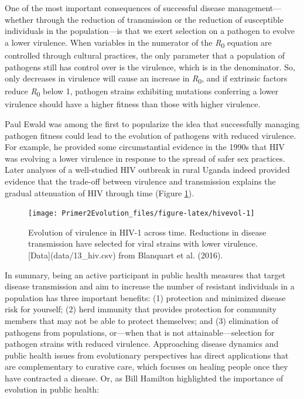 \documentclass[
]{book}
\begin{document}
One of the most important consequences of successful disease management---whether through the reduction of transmission or the reduction of susceptible individuals in the population---is that we exert selection on a pathogen to evolve a lower virulence. When variables in the numerator of the \emph{R}\textsubscript{0} equation are controlled through cultural practices, the only parameter that a population of pathogens still has control over is the virulence, which is in the denominator. So, only decreases in virulence will cause an increase in \emph{R}\textsubscript{0}, and if extrinsic factors reduce \emph{R}\textsubscript{0} below 1, pathogen strains exhibiting mutations conferring a lower virulence should have a higher fitness than those with higher virulence.

Paul Ewald was among the first to popularize the idea that successfully managing pathogen fitness could lead to the evolution of pathogens with reduced virulence. For example, he provided some circumstantial evidence in the 1990s that HIV was evolving a lower virulence in response to the spread of safer sex practices. Later analyses of a well-studied HIV outbreak in rural Uganda indeed provided evidence that the trade-off between virulence and transmission explains the gradual attenuation of HIV through time (Figure \ref{fig:hivevol}).

\begin{figure}
\texttt{[image: Primer2Evolution\_files/figure-latex/hivevol-1]} \caption{Evolution of virulence in HIV-1 across time. Reductions in disease transmission have selected for viral strains with lower virulence. [Data](data/13_hiv.csv) from Blanquart et al. (2016).}\label{fig:hivevol}
\end{figure}

In summary, being an active participant in public health measures that target disease transmission and aim to increase the number of resistant individuals in a population has three important benefits: (1) protection and minimized disease risk for yourself; (2) herd immunity that provides protection for community members that may not be able to protect themselves; and (3) elimination of pathogens from populations, or---when that is not attainable---selection for pathogen strains with reduced virulence. Approaching disease dynamics and public health issues from evolutionary perspectives has direct applications that are complementary to curative care, which focuses on healing people once they have contracted a disease. Or, as Bill Hamilton highlighted the importance of evolution in public health:
\end{document}
